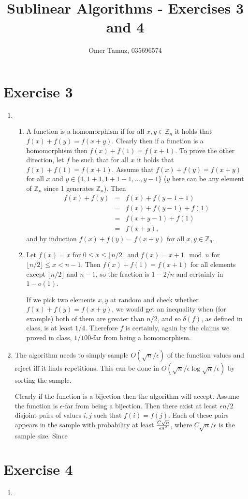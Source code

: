 \documentclass[11pt]{article} \usepackage{amssymb}
\newcommand{\Z}{\mathbb Z} \newcommand{\CalE}{{\mathcal{E}}}
\begin{document}
\title{Sublinear Algorithms - Exercises 3 and 4}

 \author{Omer Tamuz, 035696574}
\maketitle

\section{Exercise 3}
\begin{enumerate}
\item 
  \begin{enumerate}
  \item A function is a homomorphism if for all $x,y\in \Z_n$ it holds that 
    $f(x)+f(y)=f(x+y)$. Clearly then if a function is a homomorphism then
    $f(x)+f(1)=f(x+1)$. To prove the other direction, let $f$ be such that
    for all $x$ it holds that $f(x)+f(1)=f(x+1)$. Assume that 
    $f(x)+f(y)=f(x+y)$ for all $x$ and $y\in\{1,1+1,1+1+1,\ldots,y-1\}$ 
    ($y$ here can be any element of $\Z_n$ since 1 generates $\Z_n$). Then
    \begin{eqnarray*}
      f(x)+f(y)&=&f(x)+f(y-1+1)
      \\ &=& f(x)+f(y-1)+f(1)
      \\ &=& f(x+y-1)+f(1)
      \\ &=& f(x+y),
    \end{eqnarray*}
    and by induction $f(x)+f(y)=f(x+y)$ for all $x,y\in \Z_n$.
  \item
    Let $f(x)=x$ for $0\leq x\leq \lfloor n/2\rfloor$ and  
    $f(x)=x+1\mod n$ for $\lfloor n/2\rfloor\leq x < n-1$. Then $f(x)+f(1)=f(x+1)$ for all elements
    except $\lfloor n/2\rfloor$ and $n-1$, so the fraction is $1-2/n$ and certainly in
    $1-o(1)$. 

    If we pick two elements $x,y$  at random and check whether 
    $f(x)+f(y)=f(x+y)$, we would get an inequality when (for example) both
    of them are greater than $n/2$, and 
    so $\delta(f)$,  as defined in class, is at least $1/4$. 
    Therefore $f$ is certainly, again by 
    the claims we proved in class,  $1/100$-far from  being a homomorphism.
  \end{enumerate}
\item The algorithm needs to simply sample $O(\sqrt{n}/\epsilon)$ 
  of the function
  values and reject iff it finds repetitions. This can be done in
  $O(\sqrt{n}/\epsilon\log \sqrt{n}/\epsilon)$ by sorting the sample.

  Clearly if the function is a bijection then the algorithm will accept.
  Assume the function is $\epsilon$-far from being a bijection. Then there exist
  at least $\epsilon n/2$ disjoint pairs of values $i,j$ such that $f(i)=f(j)$. Each of these
  pairs appears in the sample with probability at least 
  ${C\sqrt{n}\over \epsilon n^2}$, where $C\sqrt{n}/\epsilon$ is the sample
  size. Since 
\end{enumerate}
\section{Exercise 4}
\begin{enumerate}
  \item 

\end{enumerate}
\end{document}
